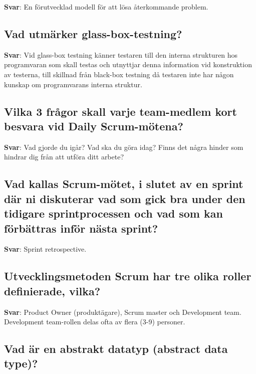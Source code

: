 \documentclass[a4paper,11pt,oneside]{article}
\begin{document}
\begin{sloppypar}
\textbf{Svar}: En f\"orutvecklad modell f\"or att l\"osa \r{a}terkommande problem.



\subsection{Vad utm\"arker glass-box-testning?}

\label{q:247:sa:sv:True}

\textbf{Svar}: Vid glass-box testning k\"anner testaren till den interna strukturen hos programvaran som skall testas och utnyttjar denna information vid konstruktion av testerna, till skillnad fr\r{a}n black-box testning d\r{a} testaren inte har n\r{a}gon kunskap om programvarans interna struktur.



\subsection{Vilka 3 fr\r{a}gor skall varje team-medlem kort besvara vid Daily Scrum-m\"otena?}

\label{q:248:sa:sv:True}

\textbf{Svar}: Vad gjorde du ig\r{a}r? Vad ska du g\"ora idag? Finns det n\r{a}gra hinder som hindrar dig fr\r{a}n att utf\"ora ditt arbete?



\subsection{Vad kallas Scrum-m\"otet, i slutet av en sprint d\"ar ni diskuterar vad som gick bra under den tidigare sprintprocessen och vad som kan f\"orb\"attras inf\"or n\"asta sprint?}

\label{q:249:sa:sv:True}

\textbf{Svar}: Sprint retrospective.



\subsection{Utvecklingsmetoden Scrum har tre olika roller definierade, vilka?}

\label{q:250:sa:sv:True}

\textbf{Svar}: Product Owner (produkt\"agare), Scrum master och Development team. Development team-rollen delas ofta av flera (3-9) personer.



\subsection{Vad \"ar en abstrakt datatyp (abstract data type)?}


\end{sloppypar}
\end{document}
